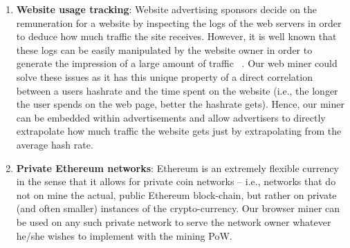 \documentclass[runningheads]{llncs}
\begin{document}
\begin{enumerate}
\item \textbf{Website usage tracking}: Website advertising sponsors decide on the remuneration for a website by inspecting the logs of the web servers in order to deduce how much traffic the site receives. However, it is well known that these logs can be easily manipulated by the website owner in order to generate the impression of a large amount of traffic ~\cite{webLogsManipulation}. Our web miner could solve these issues as it has this unique property of a direct correlation between a users hashrate and the time spent on the website (i.e., the longer the user spends on the web page, better the hashrate gets). Hence, our miner can be embedded within advertisements and allow advertisers to directly extrapolate how much traffic the website gets just by extrapolating from the average hash rate.
\item \textbf{Private Ethereum networks}: Ethereum is an extremely flexible currency in the sense that it allows for private coin networks -- i.e., networks that do not on mine the actual, public Ethereum block-chain, but rather on private (and often smaller) instances of the crypto-currency. Our browser miner can be used on any such private network to serve the network owner whatever he/she wishes to implement with the mining PoW.
\end{enumerate}
\end{document}
